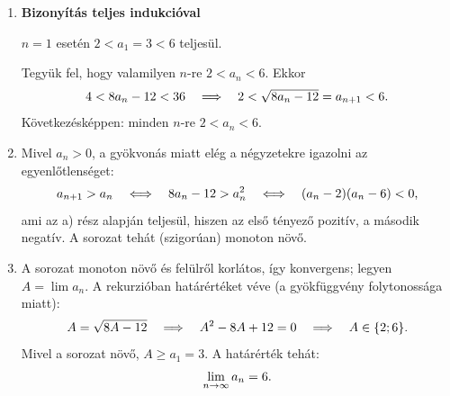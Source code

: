 \documentclass[11pt]{scrartcl}
\begin{document}
\begin{enumerate}
	\item \textbf{Bizonyítás teljes indukcióval}

	      $n = 1$ esetén $2 < a_1 = 3 < 6$ teljesül.

	      Tegyük fel, hogy valamilyen $n$-re $2 < a_n < 6$. Ekkor
	      \[
		      4 < 8a_n - 12 < 36
		      \quad \Longrightarrow \quad
		      2 < \sqrt{8a_n - 12} = a_{n + 1} < 6
		      \text.
	      \]
	      Következésképpen: minden $n$-re $2 < a_n < 6$.

	\item Mivel $a_n > 0$, a gyökvonás miatt elég a négyzetekre igazolni az
	      egyenlőtlenséget:
	      \[
		      a_{n + 1} > a_n
		      \quad \Longleftrightarrow \quad
		      8a_n - 12 > a_n^2
		      \quad \Longleftrightarrow \quad
		      (a_n - 2)(a_n - 6) < 0
		      \text,
	      \]
	      ami az a) rész alapján teljesül, hiszen az első tényező pozitív, a
	      második negatív. A sorozat tehát (szigorúan) monoton növő.

	\item A sorozat monoton növő és felülről korlátos, így konvergens; legyen
	      $A = \lim a_n$. A rekurzióban határértéket véve (a gyökfüggvény
	      folytonossága miatt):
	      \[
		      A = \sqrt{8A - 12}
		      \quad \Longrightarrow \quad
		      A^2 - 8A + 12 = 0
		      \quad \Longrightarrow \quad
		      A \in \{2; 6\}
		      \text.
	      \]
	      Mivel a sorozat növő, $A \ge a_1 = 3$. A határérték tehát:
	      \[
		      \lim_{n \to \infty} a_n = 6
		      \text.
	      \]
\end{enumerate}
\end{document}
